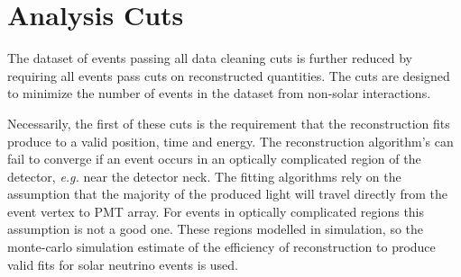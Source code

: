 
\section{Analysis Cuts}
\label{sec:analysis_cuts}
The dataset of events passing all data cleaning cuts is further reduced by
requiring all events pass cuts on reconstructed quantities.
The cuts are designed to minimize the number of events in the dataset from
non-solar interactions.

Necessarily, the first of these cuts is the requirement that the reconstruction
fits produce to a valid position, time and energy.
The reconstruction algorithm's can fail to converge if an event occurs in an
optically complicated region of the detector, \textit{e.g.} near the detector
neck. The fitting algorithms rely on the assumption that the majority of
the produced light will travel directly from the event vertex to PMT array.
For events in optically complicated regions this assumption is not a good one.
These regions modelled in simulation, so the monte-carlo simulation estimate of
the efficiency of reconstruction to produce valid fits for solar neutrino events
is used.

